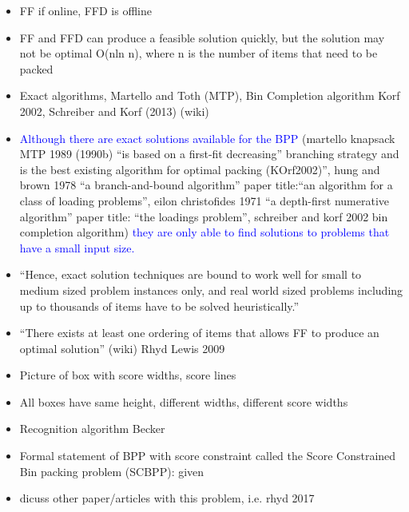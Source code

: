 \documentclass[oribibl]{llncs}
\begin{document}
\begin{itemize}
	\item FF if online, FFD is offline
	\item FF and FFD can produce a feasible solution quickly, but the solution may not be optimal O(nln n), where n is the number of items that need to be packed
	\item Exact algorithms, Martello and Toth (MTP), Bin Completion algorithm Korf 2002, Schreiber and Korf (2013) (wiki)
	\item \textcolor{blue}{Although there are exact solutions available for the BPP} (martello knapsack MTP 1989 (1990b) ``is based on a first-fit decreasing'' branching strategy and is the best existing algorithm for optimal packing (KOrf2002)'', hung and brown 1978 ``a branch-and-bound algorithm'' paper title:``an algorithm for a class of loading problems'', eilon christofides 1971 ``a depth-first numerative algorithm'' paper title: ``the loadings problem'', schreiber and korf 2002 bin completion algorithm) \textcolor{blue}{they are only able to find solutions to problems that have a small input size.}
	\item ``Hence, exact solution techniques are bound to work well for small to medium sized problem instances only, and real world sized problems including up to thousands of items have to be solved heuristically.''
	\item ``There exists at least one ordering of items that allows FF to produce an optimal solution'' (wiki) Rhyd Lewis 2009
	\item Picture of box with score widths, score lines
	\item All boxes have same height, different widths, different score widths
	\item Recognition algorithm Becker
	\item Formal statement of BPP with score constraint called the Score Constrained Bin packing problem (SCBPP): given
	\item dicuss other paper/articles with this problem, i.e. rhyd 2017	
\end{itemize}
\end{document}
